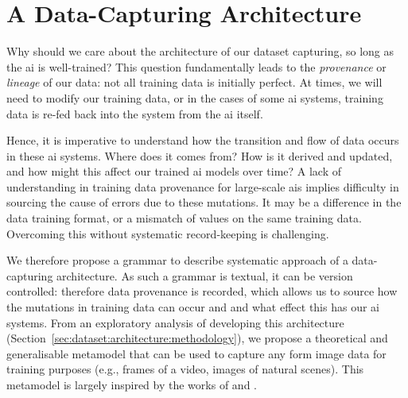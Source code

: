 \section{A Data-Capturing Architecture}
\label{sec:dataset:architecture}

Why should we care about the architecture of our dataset capturing, so long as the \gls{ai} is well-trained? This question fundamentally leads to the \textit{provenance} or \textit{lineage} of our data: not all training data is initially perfect. At times, we will need to modify our training data, or in the cases of some \gls{ai} systems, training data is re-fed back into the system from the \gls{ai} itself. 

Hence, it is imperative to understand how the transition and flow of data occurs \citep{Cui:2003im,Ikeda:2009ca,Buneman:2000bn} in these \gls{ai} systems. Where does it comes from? How is it derived and updated, and how might this affect our trained \gls{ai} models over time? A lack of understanding in training data provenance for large-scale \glspl{ai} implies difficulty in sourcing the cause of errors due to these mutations. It may be a difference in the data training format, or a mismatch of values on the same training data. Overcoming this without systematic record-keeping is challenging.

We therefore propose a grammar to describe systematic approach of a data-capturing architecture. As such a grammar is textual, it can be version controlled: therefore data provenance is recorded, which allows us to source how the mutations in training data can occur and and what effect this has our \gls{ai} systems. From an exploratory analysis of developing this architecture (Section~\ref{sec:dataset:architecture:methodology}), we propose a theoretical and generalisable metamodel that can be used to capture any form image data for training purposes (e.g., frames of a video, images of natural scenes). This metamodel is largely inspired by the works of \citet{Wickham:2010hy, Wickham:2007tu} and \citet{Moody:2009vo}.


\clearpage



